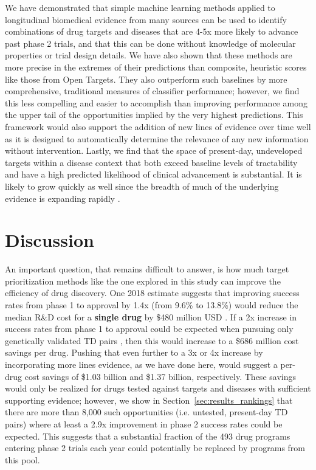 \documentclass{article}
\begin{document}
We have demonstrated that simple machine learning methods applied to longitudinal biomedical evidence from many sources can be used to identify combinations of drug targets and diseases that are 4-5x more likely to advance past phase 2 trials, and that this can be done without knowledge of molecular properties or trial design details. We have also shown that these methods are more precise in the extremes of their predictions than composite, heuristic scores like those from Open Targets. They also outperform such baselines by more comprehensive, traditional measures of classifier performance; however, we find this less compelling and easier to accomplish than improving performance among the upper tail of the opportunities implied by the very highest predictions. This framework would also support the addition of new lines of evidence over time well as it is designed to automatically determine the relevance of any new information without intervention. Lastly, we find that the space of present-day, undeveloped targets within a disease context that both exceed baseline levels of tractability and have a high predicted likelihood of clinical advancement is substantial. It is likely to grow quickly as well since the breadth of much of the underlying evidence is expanding rapidly \cite{PMID:33214558,PMID:36634672,PMID:31491408}.

\section{Discussion}
\label{sec:discussion}

An important question, that remains difficult to answer, is how much target prioritization methods like the one explored in this study can improve the efficiency of drug discovery. One 2018 estimate suggests that improving success rates from phase 1 to approval by 1.4x (from 9.6\% to 13.8\%) would reduce the median R\&D cost for a \textbf{single drug} by \$480 million USD \cite{PMID:32125404}. If a 2x increase in success rates from phase 1 to approval could be expected when pursuing only genetically validated TD pairs \cite{Nelson2015-eg}, then this would increase to a \$686 million cost savings per drug. Pushing that even further to a 3x or 4x increase by incorporating more lines evidence, as we have done here, would suggest a per-drug cost savings of \$1.03 billion and \$1.37 billion, respectively. These savings would only be realized for drugs tested against targets and diseases with sufficient supporting evidence; however, we show in Section~\ref{sec:results_rankings} that there are more than 8,000 such opportunities (i.e. untested, present-day TD pairs) where at least a 2.9x improvement in phase 2 success rates could be expected. This suggests that a substantial fraction of the 493 drug programs entering phase 2 trials each year \cite{BIOReport} could potentially be replaced by programs from this pool.
\end{document}
